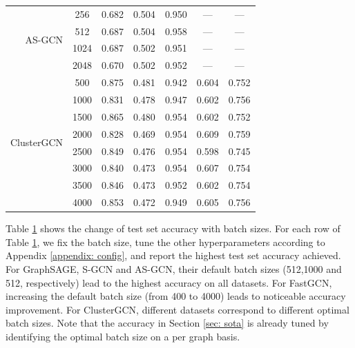 \begin{table}[!ht]
\begin{tabular}{rcccccc}
        \midrule
        \multirow{4}{*}{AS-GCN} & 256 & 0.682 & 0.504 & 0.950 & ---\footnotemark[3] & ---\footnotemark[3] \\
         & 512\footnotemark[1] & 0.687 & 0.504 & 0.958 & ---\footnotemark[3] & ---\footnotemark[3]\\
         & 1024 & 0.687 & 0.502 & 0.951 & ---\footnotemark[3] & ---\footnotemark[3]\\
         & 2048 & 0.670 & 0.502 & 0.952 & ---\footnotemark[3] & ---\footnotemark[3]\\
        \midrule
        \multirow{8}{*}{ClusterGCN} & 500 & 0.875 & 0.481 & 0.942 & 0.604 & 0.752\\
         & 1000 & 0.831 & 0.478 & 0.947 & 0.602 & 0.756 \\
         & 1500 & 0.865 & 0.480 & 0.954 & 0.602 & 0.752\\
         & 2000 & 0.828 & 0.469 & 0.954 & 0.609 & 0.759\\
         & 2500 & 0.849 & 0.476 & 0.954 & 0.598 & 0.745\\
         & 3000 & 0.840 & 0.473 & 0.954 & 0.607 & 0.754\\
         & 3500 & 0.846 & 0.473 & 0.952 & 0.602 & 0.754\\
         & 4000 & 0.853 & 0.472 & 0.949 & 0.605 & 0.756\\
        \bottomrule
    \end{tabular}%
    \label{tab: exp-fastgcn-batch}
\end{table}





Table \ref{tab: exp-fastgcn-batch} shows the change of test set accuracy with batch sizes.
For each row of Table \ref{tab: exp-fastgcn-batch}, we fix the batch size, tune the other hyperparameters according to Appendix \ref{appendix: config}, and report the highest test set accuracy achieved. 
For GraphSAGE, S-GCN and AS-GCN, their default batch sizes (512,1000 and 512, respectively) lead to the highest accuracy on all datasets. For FastGCN, increasing the default batch size (from 400 to 4000) leads to noticeable accuracy improvement. For ClusterGCN, different datasets correspond to different optimal batch sizes. Note that the accuracy in Section \ref{sec: sota} is already tuned by identifying the optimal batch size on a per graph basis.

